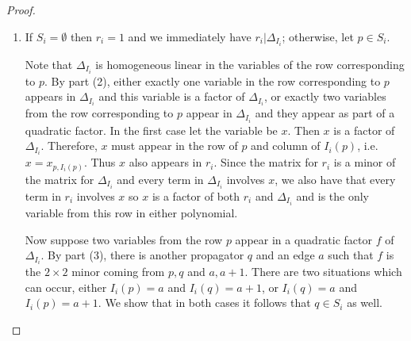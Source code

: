 \documentclass[11pt]{article}
\theoremstyle{remark}
\theoremstyle{definition}
\begin{document}
\begin{proof}
\begin{enumerate}
Now let $f$ be a quadratic factor of $\Delta_{I_i}$.  By part (2) we know that $f$ is a $2\times 2$ minor coming from two propagators, call them $p$ and $q$, and two vertices, call them $a$ and $b$, and assume that $a <_i b$.  It remains to show that $b = a+1$.  From this we can conclude that $p$ and $q$ each have one end on edge $a$. 

As in the proof of part (2), make a new admissible diagram by removing the propagators which come before those contributing to $f$ in the order imposed by $I_i$.  Without loss of generality we may assume $i=a$. The cases in the proof of part (2) show how $\Delta_{I_i}$ factors: in particular the vertices supporting the other end of $p$ either do not appear in $I_i$, or they contribute to a different factor of $\Delta_{I_i}$ than $p$ and $a$ do.  By assumption $b$ contributes to the same factor as $a$.  Therefore, $(a,b)$ is an edge defining an end of $p$, that is, $b = a+1$.

\item If $S_i = \emptyset$ then $r_i = 1$ and we immediately have $r_i | \Delta_{I_i}$; otherwise, let $p\in S_i$. 

Note that $\Delta_{I_i}$ is homogeneous linear in the variables of the row corresponding to $p$.  By part (2), either exactly one variable in the row corresponding to $p$ appears in $\Delta_{I_i}$ and this variable is a factor of $\Delta_{I_i}$, or exactly two variables from the row corresponding to $p$ appear in $\Delta_{I_i}$ and they appear as part of a quadratic factor.  In the first case let the variable be $x$. Then $x$ is a factor of $\Delta_{I_i}$. Therefore, $x$ must appear in the row of $p$ and column of $I_i(p)$, i.e. $x = x_{p, I_i(p)}$. Thus $x$ also appears in $r_i$. Since the matrix for $r_i$ is a minor of the matrix for $\Delta_{I_i}$ and every term in $\Delta_{I_i}$ involves $x$, we also have that every term in $r_i$ involves $x$ so $x$ is a factor of both $r_i$ and $\Delta_{I_i}$ and is the only variable from this row in either polynomial.

  Now suppose two variables from the row $p$ appear in a quadratic factor $f$ of $\Delta_{I_i}$.  By part (3), there is another propagator $q$ and an edge $a$ such that $f$ is the $2\times 2$ minor coming from $p, q$ and $a, a+1$.  There are two situations which can occur, either $I_i(p)=a$ and $I_i(q)=a+1$, or $I_i(q)=a$ and $I_i(p)=a+1$. 
    We show that in both cases it follows that $q \in S_i$ as well.


\end{enumerate}
\end{proof}
\end{document}
